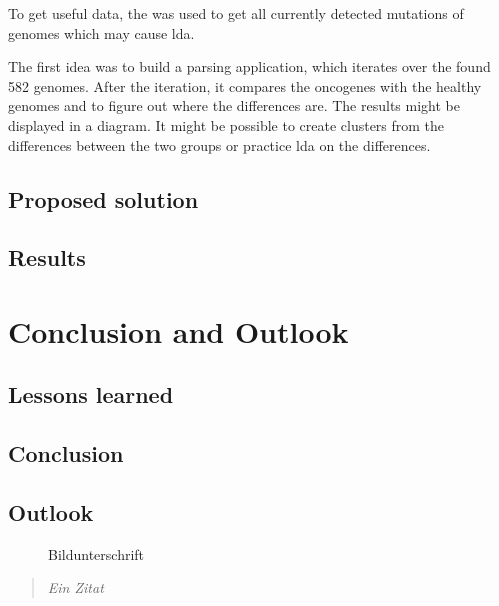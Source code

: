 To get useful data, the \autocite{ncbi} was used to get all currently detected mutations of genomes which may cause \gls{lda}.

The first idea was to build a parsing application, which iterates over the found 582 genomes. After the iteration, it compares the oncogenes with the healthy genomes and to figure out where the differences are. The results might be displayed in a diagram. It might be possible to create clusters from the differences between the two groups or practice \gls{lda} on the differences.

\section{Proposed solution}\label{proposed_solution}
\section{Results}\label{results}

\chapter{Conclusion and Outlook}\label{conclusion_outlook}
\section{Lessons learned}\label{lessons_learned}
\section{Conclusion}\label{conclusion}
\section{Outlook}\label{outlook}	
	
		\begin{figure}[htbp]
			\centering
			\caption[xxx]{Bildunterschrift}
			\label{xxx}
		\end{figure}
		
		
		\begin{quote}
			\textit{Ein Zitat}
		\end{quote}


				\autocite[20]{}


\newpage






